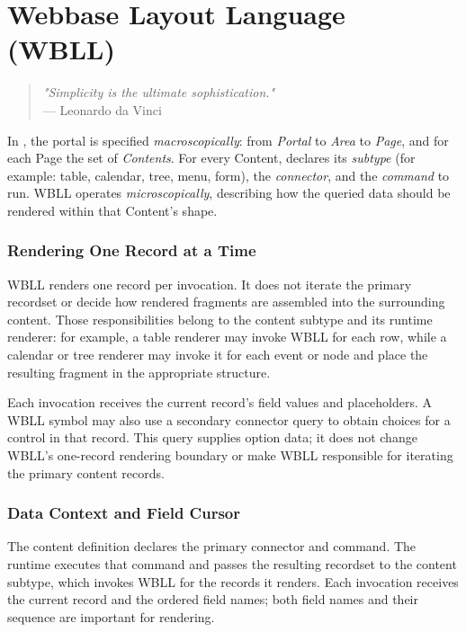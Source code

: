 
\chapter{Webbase Layout Language (WBLL)}
\label{chap:wbll}

\begin{quote}
\textit{"Simplicity is the ultimate sophistication."} \\
— Leonardo da Vinci
\end{quote}

In \wbol{}, the portal is specified \textit{macroscopically}: from \emph{Portal} to \emph{Area} to \emph{Page}, and for each Page the set of \emph{Contents}. For every Content, \wbol{} declares its \emph{subtype} (for example: table, calendar, tree, menu, form), the \emph{connector}, and the \emph{command} to run. WBLL operates \textit{microscopically}, describing how the queried data should be rendered within that Content’s shape.

\subsection{Rendering One Record at a Time}
\label{sec:wbll-record-context}

WBLL renders one record per invocation. It does not iterate the primary recordset or decide how rendered fragments are assembled into the surrounding content. Those responsibilities belong to the \wbol{} content subtype and its runtime renderer: for example, a table renderer may invoke WBLL for each row, while a calendar or tree renderer may invoke it for each event or node and place the resulting fragment in the appropriate structure.

Each invocation receives the current record's field values and placeholders. A WBLL symbol may also use a secondary connector query to obtain choices for a control in that record. This query supplies option data; it does not change WBLL's one-record rendering boundary or make WBLL responsible for iterating the primary content records.

\subsection{Data Context and Field Cursor}

The \wbol{} content definition declares the primary connector and command. The runtime executes that command and passes the resulting recordset to the content subtype, which invokes WBLL for the records it renders. Each invocation receives the current record and the ordered field names; both field names and their sequence are important for rendering.

